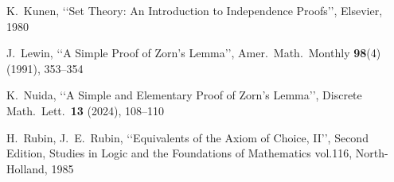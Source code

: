 \documentclass{article}
\begin{document}
\begin{thebibliography}{9}

    K.~Kunen,
    \lq\lq Set Theory: An Introduction to Independence Proofs\rq\rq,
    Elsevier, 1980

    J.~Lewin,
    \lq\lq A Simple Proof of Zorn's Lemma\rq\rq,
    Amer.\ Math.\ Monthly \textbf{98}(4) (1991),
    353--354

    K.~Nuida,
    \lq\lq A Simple and Elementary Proof of Zorn's Lemma\rq\rq,
    Discrete Math.\ Lett.\ \textbf{13} (2024), 108--110

    H.~Rubin, J.~E.~Rubin, 
    \lq\lq Equivalents of the Axiom of Choice, II\rq\rq, Second Edition, 
    Studies in Logic and the Foundations of Mathematics vol.116, North-Holland, 1985

\end{thebibliography}
\end{document}
